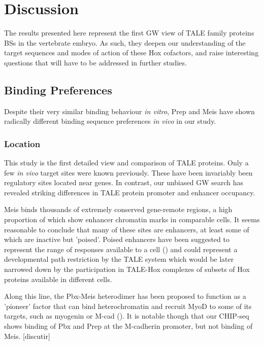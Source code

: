 \chapter{Discussion}
\label{chp:discussion}

The results presented here represent the first \ac{GW} view of \ac{TALE} family proteins \acp{BS} in the vertebrate embryo. As such, they deepen our understanding of the target sequences and modes of action of these Hox cofactors, and raise interesting questions that will have to be addressed in further studies. 

\section{Binding Preferences}

Despite their very similar binding behaviour \textit{in vitro}, Prep and Meis have shown radically different binding sequence preferences \textit{in vivo} in our study. 

\subsection{Location}

This study is the first detailed view and comparison of \ac{TALE} proteins. Only a few \textit{in vivo} target sites were known previously. These have been invariably been regulatory sites located near genes. In contrast, our unbiased \ac{GW} search has revealed striking differences in \ac{TALE} protein promoter and enhancer occupancy. 

Meis binds thousands of extremely conserved gene-remote regions, a high proportion of which show enhancer chromatin marks in comparable cells. It seems reasonable to conclude that many of these sites are enhancers, at least some of which are inactive but 'poised'. Poised enhancers have been suggested to represent the range of responses available to a cell (\cite{Creyghton2010}) and could represent a developmental path restriction by the \ac{TALE} system which would be later narrowed down by the participation in \ac{TALE}-Hox complexes of subsets of Hox proteins available in different cells. 

Along this line, the Pbx-Meis heterodimer has been proposed to function as a 'pioneer' factor that can bind heterochromatin and recruit MyoD to some of its targets, such as myogenin or M-cad (\cite{Berkes2004}). It is notable though that our \ac{CHIP}-seq shows binding of Pbx and Prep at the M-cadherin promoter, but not binding of Meis. [discutir]


